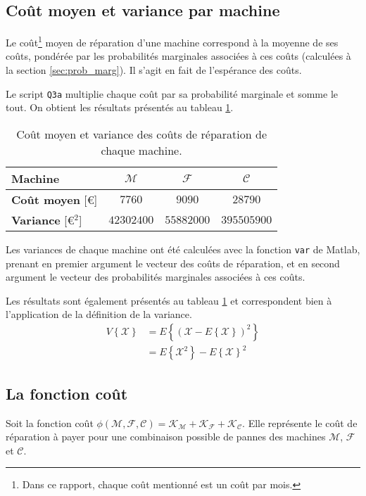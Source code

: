 \documentclass[a4paper, 12pt]{article}
\newcommand{\M}{\mathcal{M}}
\newcommand{\F}{\mathcal{F}}
\newcommand{\C}{\mathcal{C}}
\newcommand{\K}{\mathcal{K}}
\newcommand{\X}{\mathcal{X}}
\begin{document}
	\subsection{Coût moyen et variance par machine}
	\label{sec:sec_Q3a}
	Le coût\footnote{Dans ce rapport, chaque coût mentionné est un coût par mois.} moyen de réparation d'une machine correspond à la moyenne de ses coûts, pondérée par les probabilités marginales associées à ces coûts (calculées à la section \ref{sec:prob_marg}). Il s'agit en fait de l'espérance des coûts.\par
	Le script \texttt{Q3a} multiplie chaque coût par sa probabilité marginale et somme le tout. On obtient les résultats présentés au tableau \ref{tab:tab_Q3a}.\par
	\begin{table}[!ht]
	    \centering
	    \begin{tabular}{|l|c|c|c|}
	        \hline
	        \textbf{Machine} & \(\M\) & \(\F\) & \(\C\)\\
	        \hline
	        \hline
	        \textbf{Coût moyen} [\euro{}] & \(\num{7760}\) & \(\num{9090}\) & \(\num{28790}\)\\
	        \hline
	        \textbf{Variance} [\euro{}\(^2\)] & \(\num{42302400}\) & \(\num{55882000}\) & \(\num{395505900}\)\\
	        \hline
	    \end{tabular}
	    \caption{Coût moyen et variance des coûts de réparation de chaque machine.}
	    \label{tab:tab_Q3a}
	\end{table}
	Les variances de chaque machine ont été calculées avec la fonction \texttt{var} de Matlab, prenant en premier argument le vecteur des coûts de réparation, et en second argument le vecteur des probabilités marginales associées à ces coûts.\par
	Les résultats sont également présentés au tableau \ref{tab:tab_Q3a} et correspondent bien à l'application de la définition de la variance.
	\begin{align*}
	    V\left\{\X\right\} &= E\left\{\left(\X - E\left\{\X\right\}\right)^2\right\}\\
	    &= E\left\{\X^2\right\} - E\left\{\X\right\}^2
	\end{align*}
	\subsection{La fonction coût}
	Soit la fonction coût \(\phi\left(\M, \F, \C\right) = \K_\M + \K_\F + \K_\C\). Elle représente le coût de réparation à payer pour une combinaison possible de pannes des machines \(\M\), \(\F\) et \(\C\).
\end{document}
